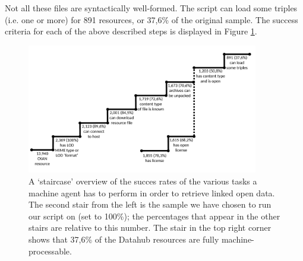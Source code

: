 Not all these files are syntactically well-formed.
The script can load some triples (i.e. one or more) for 891 resources,
 or 37,6\% of the original sample.
The success criteria for each of the above described steps is displayed
 in Figure \ref{fig:stairs}.

\begin{figure}[th!]
  \label{fig:stairs}
  \centering
  \includegraphics[width=0.9\textwidth]{./img/stairs}
  \caption{
    A `staircase' overview of the succes rates of the various tasks
     a machine agent has to perform in order to retrieve
     linked open data.
    The second stair from the left is the sample we have chosen to
     run our script on (set to 100\%);
     the percentages that appear in the other stairs are relative
     to this number.
    The stair in the top right corner shows that 37,6\% of
     the Datahub resources are fully machine-processable.
  }
\end{figure}


